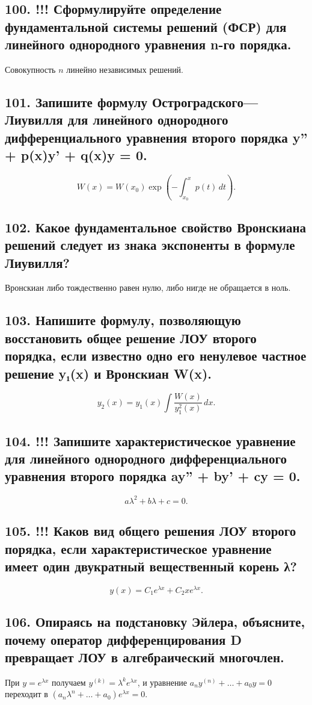 \documentclass[a4paper,12pt]{article}
\begin{document}
\subsection*{100. !!! Сформулируйте определение фундаментальной системы решений (ФСР) для линейного однородного уравнения n-го порядка.}
Совокупность \(n\) линейно независимых решений.

\subsection*{101. Запишите формулу Остроградского—Лиувилля для линейного однородного дифференциального уравнения второго порядка y'' + p(x)y' + q(x)y = 0.}
\[ W(x) = W(x_0) \exp\!\left(-\int_{x_0}^x p(t)\,dt\right). \]

\subsection*{102. Какое фундаментальное свойство Вронскиана решений следует из знака экспоненты в формуле Лиувилля?}
Вронскиан либо тождественно равен нулю, либо нигде не обращается в ноль.

\subsection*{103. Напишите формулу, позволяющую восстановить общее решение ЛОУ второго порядка, если известно одно его ненулевое частное решение y₁(x) и Вронскиан W(x).}
\[ y_2(x) = y_1(x) \int \frac{W(x)}{y_1^2(x)}\,dx. \]

\subsection*{104. !!! Запишите характеристическое уравнение для линейного однородного дифференциального уравнения второго порядка ay'' + by' + cy = 0.}
\[ a\lambda^2 + b\lambda + c = 0. \]

\subsection*{105. !!! Каков вид общего решения ЛОУ второго порядка, если характеристическое уравнение имеет один двукратный вещественный корень λ?}
\[ y(x) = C_1 e^{\lambda x} + C_2 x e^{\lambda x}. \]

\subsection*{106. Опираясь на подстановку Эйлера, объясните, почему оператор дифференцирования D превращает ЛОУ в алгебраический многочлен.}
При \(y = e^{\lambda x}\) получаем \(y^{(k)} = \lambda^k e^{\lambda x}\), и уравнение \(a_n y^{(n)} + \dots + a_0 y = 0\) переходит в \( (a_n \lambda^n + \dots + a_0) e^{\lambda x} = 0\).
\end{document}
